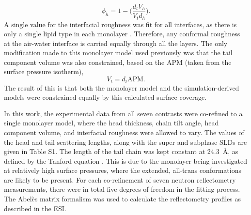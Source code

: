 \documentclass[amsmath,amssymb,twocolumn,superscriptaddress]{revtex4-1}
\begin{document}
%
\begin{equation}
  \phi_h = 1 - \bigg(\frac{d_tV_h}{V_td_h}\bigg).
\end{equation}
%
A single value for the interfacial roughness was fit for all interfaces, as there is only a single lipid type in each monolayer \cite{Campbell2018}.
Therefore, any conformal roughness at the air-water interface is carried equally through all the layers.
The only modification made to this monolayer model used previously was that the tail component volume was also constrained, based on the APM (taken from the surface pressure isotherm),
%
\begin{equation}
  V_t = d_t \text{APM}.
\end{equation}
%
The result of this is that both the monolayer model and the simulation-derived models were constrained equally by this calculated surface coverage.

In this work, the experimental data from all seven contrasts were co-refined to a single monolayer model, where the head thickness, chain tilt angle, head component volume, and interfacial roughness were allowed to vary.
The values of the head and tail scattering lengths, along with the super and subphase SLDs are given in Table S1.
The length of the tail chain was kept constant at \SI{24.3}{\angstrom}, as defined by the Tanford equation \cite{Tanford1980}.
This is due to the monolayer being investigated at relatively high surface pressures, where the extended, all-trans conformations are likely to be present.
For each co-refinement of seven neutron reflectometry measurements, there were in total five degrees of freedom in the fitting process.
The Abel\`{e}s matrix formalism was used to calculate the reflectometry profiles as described in the ESI.
\end{document}
